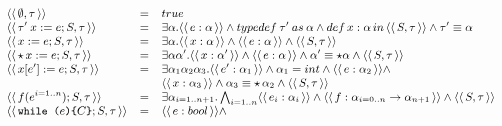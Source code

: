 \documentclass[a4paper,8pt]{article}
\newcommand{\constr}[1]{\ensuremath{\langle\langle\,#1\,\rangle\rangle}}
\begin{document}
     \begin{figure}[h]
       \[
          \small{
           \begin{array}{lcl}
               \constr{\emptyset, \tau} & = & true \\
               \constr{\tau'\:x := e; S, \tau} & = & \exists \alpha. \constr{e : \alpha} \land
                                              typedef\:\tau' \: as \:
                                                     \alpha \land
                                              def\,x:\alpha\,in\,\constr{S
                                                     , \tau}
             \land \tau' \equiv \alpha\\
               \constr{x := e ; S, \tau} & = & \exists \alpha. \constr{x : \alpha}\land\constr{e : \alpha} \land
                                                      \constr{S , \tau}\\ 
               \constr{\star\,x := e ; S, \tau} & = & \exists \alpha \alpha'. \constr{x : \alpha'}\land\constr{e : \alpha} \land
                                                      \alpha' \equiv
                                                \star
                                                      \alpha\land\constr{S
                                                      , \tau}\\ 
               \constr{x[e'] := e ; S , \tau} & = &
                                             \exists\alpha_1\alpha_2\alpha_3.\constr{e'
                                             : \alpha_1}\land \alpha_1
                                             = int \land \constr{e :
                                             \alpha_2} \land \\ 
                       & & \constr{x : \alpha_3} \land
                           \alpha_3 \equiv \star\,\alpha_2 \land
                           \constr{S , \tau}\\
               \constr{f(e^{i=1..n}) ; S , \tau} & = & \exists
                                            \alpha_{i=1..n +1}.\bigwedge_{i
                                            = 1..n}\constr{e_i :
                                            \alpha_i} \land \constr{f
                                            : \alpha_{i = 0.. n} \to
                                            \alpha_{n + 1}} \land
                                                \constr{S , \tau}\\
               \constr{\texttt{while (} e
             \texttt{)\{}C\texttt{\}} ; S , \tau} &= & \constr{e : bool}
                                                     \land

\end{array}}\]
\end{figure}
\end{document}

